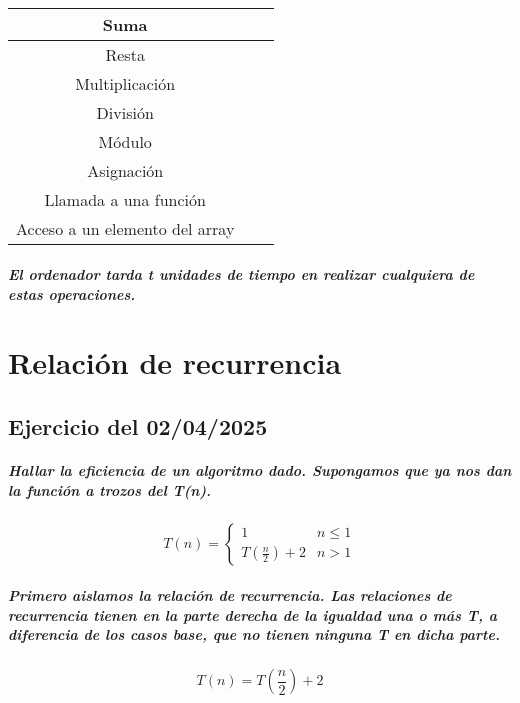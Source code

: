 \documentclass{book}
\begin{document}
      \paragraph{}
      \begin{center}
	      \begin{tabular}{|c|l|l|}
	      	\hline
	      	Suma \\
	      	\hline
	      	Resta \\
	      	\hline
	      	Multiplicación \\
	      	\hline
	      	División \\
	      	\hline
	      	Módulo \\
	      	\hline
	      	Asignación \\
	      	\hline
	      	Llamada a una función \\
	      	\hline
	      	Acceso a un elemento del array  \\
	      	\hline
	      \end{tabular}
      \end{center}
      \paragraph{El ordenador tarda \textit{t} unidades de tiempo en realizar cualquiera de estas operaciones.}
	\chapter{Relación de recurrencia}
	\section{Ejercicio del 02/04/2025}
	\paragraph{Hallar la eficiencia de un algoritmo dado. Supongamos que ya nos dan la función a trozos del T(n).}
	\[ T(n) = 	\begin{cases} 
					1 & n\leq 1 \\
					T(\frac{n}{2}) + 2 & n > 1 
				\end{cases}
       \]
       \paragraph{Primero aislamos la relación de recurrencia. Las relaciones de recurrencia tienen en la parte derecha de la igualdad una o más T, a diferencia de los casos base, que no tienen ninguna T en dicha parte.}
      \begin{equation}
	      T(n) = T(\frac{n}{2}) + 2  
      \end{equation}
\end{document}
